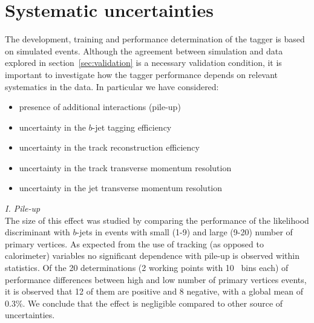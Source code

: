 \section{Systematic uncertainties}\label{sec:gbbSystematics}
The development, training and performance determination of the tagger is based on simulated events. Although the agreement between simulation and data explored in section~\ref{sec:validation} is a necessary validation condition, it is important to investigate how the tagger performance depends on relevant systematics in the data. In particular we have considered:
%
%
\begin{itemize}\addtolength{\itemsep}{-0.4\baselineskip}
\item
presence of additional interactions (pile-up)
\item
uncertainty in the $b$-jet tagging efficiency %
\item
uncertainty in the track reconstruction efficiency
\item
uncertainty in the track transverse momentum resolution
\item
uncertainty in the jet transverse momentum resolution  
\end{itemize}

{ \em I. Pile-up}
\\[3mm]
  The size of this effect was studied by comparing the performance of the likelihood discriminant with $b$-jets in events with small (1-9) and large (9-20) number of primary vertices. 
As expected from the use of tracking (as opposed to calorimeter) variables no significant dependence with pile-up is observed within statistics. Of the 20 determinations (2 working points with 10 \pt\ bins each) of performance differences between high and low number of primary vertices events, it is observed that 12 of them are positive and 8 negative, with a global mean of 0.3\%. We conclude that the effect is negligible compared to other source of uncertainties.
%

